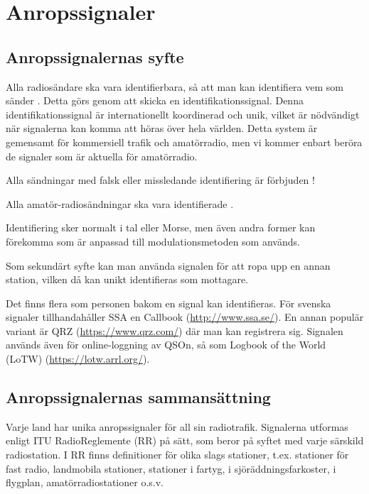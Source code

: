 \section{Anropssignaler}

\subsection{Anropssignalernas syfte}

Alla radiosändare ska vara identifierbara, så att man kan identifiera vem
som sänder \cite[§19.1]{ITU-RR}. Detta görs genom att skicka en
identifikationssignal. Denna identifikationssignal är internationellt
koordinerad och unik, vilket är nödvändigt när signalerna kan komma att
höras över hela världen. Detta system är gemensamt för kommersiell trafik och
amatörradio, men vi kommer enbart beröra de signaler som är aktuella för
amatörradio.

Alla sändningar med falsk eller missledande identifiering är förbjuden \cite[§19.2]{ITU-RR}!

Alla amatör-radiosändningar ska vara identifierade \cite[§19.4, §19.5]{ITU-RR}.

Identifiering sker normalt i tal eller Morse, men även andra former kan
förekomma som är anpassad till modulationsmetoden som används.

Som sekundärt syfte kan man använda signalen för att ropa upp en annan station,
vilken då kan unikt identifieras som mottagare.

Det finns flera som personen bakom en signal kan identifieras. För svenska
signaler tillhandahåller SSA en Callbook (\url{http://www.ssa.se/}). En annan
populär variant är QRZ (\url{https://www.qrz.com/}) där man kan registrera sig.
Signalen används även för online-loggning av QSOn, så som Logbook of the World (LoTW) (\url{https://lotw.arrl.org/}).

\subsection{Anropssignalernas sammansättning}

Varje land har unika anropssignaler för all sin radiotrafik.
Signalerna utformas enligt ITU RadioReglemente (RR) \cite[§19]{ITU-RR} på sätt,
som beror på syftet med varje särskild radiostation. I RR finns
definitioner för olika slags stationer, t.ex. stationer för fast
radio, landmobila stationer, stationer i fartyg, i
sjöräddningsfarkoster, i flygplan, amatörradiostationer o.s.v.

